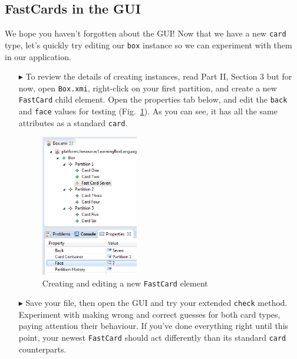 \newpage
\hypertarget{subsec:fastGUI}{}
\subsection{FastCards in the GUI}
\genHeader

We hope you haven't forgotten about the GUI! Now that we have a new \texttt{card} type, let's quickly try editing our \texttt{box} instance so we can experiment
with them in our application.

\begin{itemize}
  
\item[$\blacktriangleright$] To review the details of creating instances, read Part II, Section 3 but for now, open \texttt{Box.xmi}, right-click on your
first partition, and create a new \texttt{FastCard} child element. Open the properties tab below, and edit the \texttt{back} and \texttt{face} values for
testing (Fig.~\ref{eclipse:fastCardProperties}). As you can see, it has all the same attributes as a standard \texttt{card}.

\vspace{0.5cm}

\begin{figure}[htbp]
\begin{center}
  \includegraphics[width=0.4\textwidth]{eclipse_fastCardProperties}
  \caption{Creating and editing a new \texttt{FastCard} element}  
  \label{eclipse:fastCardProperties}
\end{center}
\end{figure}

\item[$\blacktriangleright$] Save your file, then open the GUI and try your extended \texttt{check} method. Experiment with making wrong and correct
guesses for both card types, paying attention their behaviour. If you've done everything right until this point, your newest \texttt{FastCard} should act
differently than its standard \texttt{card} counterparts.

\end{itemize}
